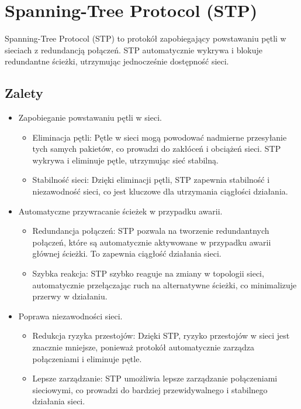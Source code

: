 \section{Spanning-Tree Protocol (STP)}

Spanning-Tree Protocol (STP) to protokół zapobiegający powstawaniu pętli w sieciach z redundancją połączeń. STP automatycznie wykrywa i blokuje redundantne ścieżki, utrzymując jednocześnie dostępność sieci.

\subsection{Zalety}
\begin{itemize}
    \item Zapobieganie powstawaniu pętli w sieci.
    \begin{itemize}
        \item Eliminacja pętli: Pętle w sieci mogą powodować nadmierne przesyłanie tych samych pakietów, co prowadzi do zakłóceń i obciążeń sieci. STP wykrywa i eliminuje pętle, utrzymując sieć stabilną.
        \item Stabilność sieci: Dzięki eliminacji pętli, STP zapewnia stabilność i niezawodność sieci, co jest kluczowe dla utrzymania ciągłości działania.
    \end{itemize}
    \item Automatyczne przywracanie ścieżek w przypadku awarii.
    \begin{itemize}
        \item Redundancja połączeń: STP pozwala na tworzenie redundantnych połączeń, które są automatycznie aktywowane w przypadku awarii głównej ścieżki. To zapewnia ciągłość działania sieci.
        \item Szybka reakcja: STP szybko reaguje na zmiany w topologii sieci, automatycznie przełączając ruch na alternatywne ścieżki, co minimalizuje przerwy w działaniu.
    \end{itemize}
    \item Poprawa niezawodności sieci.
    \begin{itemize}
        \item Redukcja ryzyka przestojów: Dzięki STP, ryzyko przestojów w sieci jest znacznie mniejsze, ponieważ protokół automatycznie zarządza połączeniami i eliminuje pętle.
        \item Lepsze zarządzanie: STP umożliwia lepsze zarządzanie połączeniami sieciowymi, co prowadzi do bardziej przewidywalnego i stabilnego działania sieci.
    \end{itemize}
\end{itemize}


